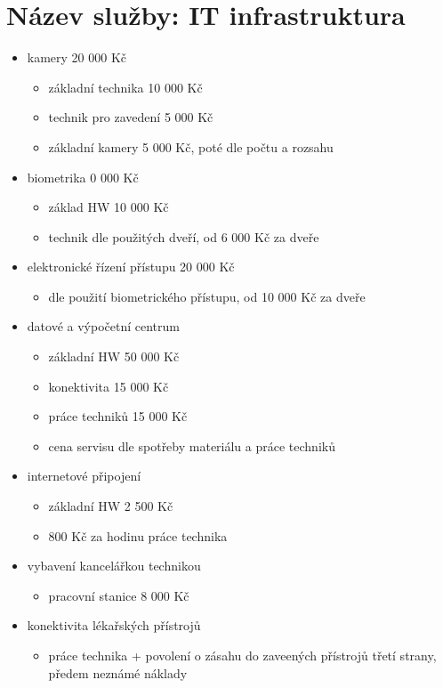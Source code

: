 \documentclass[11pt, a4paper, titlepage]{article}
\begin{document}
	\section*{Název služby: IT infrastruktura}
	\begin{itemize}
		\item kamery 20 000 Kč
		\begin{itemize}
			\item základní technika 10 000 Kč
			\item technik pro zavedení 5 000 Kč
			\item základní kamery 5 000 Kč, poté dle počtu a rozsahu
		\end{itemize}
		\item biometrika 0 000 Kč
		\begin{itemize}
			\item základ HW 10 000 Kč
			\item technik dle použitých dveří, od 6 000 Kč za dveře
		\end{itemize}
		\item elektronické řízení přístupu 20 000 Kč
		\begin{itemize}
			\item dle použití biometrického přístupu, od 10 000 Kč za dveře
		\end{itemize}

		\item datové a výpočetní centrum
		\begin{itemize}
			\item základní HW 50 000 Kč
			\item konektivita 15 000 Kč
			\item práce techniků 15 000 Kč
			\item cena servisu dle spotřeby materiálu a práce techniků
		\end{itemize}

		\item internetové připojení
		\begin{itemize}
			\item základní HW 2 500 Kč
			\item 800 Kč za hodinu práce technika
		\end{itemize}

		\item vybavení kancelářkou technikou
		\begin{itemize}
			\item pracovní stanice 8 000 Kč
		\end{itemize}

		\item konektivita lékařských přístrojů
		\begin{itemize}
			\item práce technika + povolení o zásahu do zaveených přístrojů třetí strany, předem neznámé náklady
		\end{itemize}
	\end{itemize}
\end{document}
